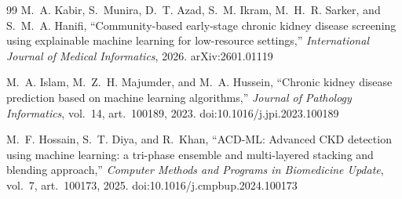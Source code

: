 \documentclass[conference]{IEEEtran}
\begin{document}
\begin{thebibliography}{99}
M.~A. Kabir, S.~Munira, D.~T. Azad, S.~M. Ikram, M.~H.~R. Sarker, and
S.~M.~A. Hanifi,
``Community-based early-stage chronic kidney disease screening using
explainable machine learning for low-resource settings,''
\emph{International Journal of Medical Informatics}, 2026.
arXiv:2601.01119

M.~A. Islam, M.~Z.~H. Majumder, and M.~A. Hussein,
``Chronic kidney disease prediction based on machine learning algorithms,''
\emph{Journal of Pathology Informatics}, vol.~14, art.~100189, 2023.
doi:10.1016/j.jpi.2023.100189

M.~F. Hossain, S.~T. Diya, and R.~Khan,
``ACD-ML: Advanced CKD detection using machine learning: a tri-phase ensemble
and multi-layered stacking and blending approach,''
\emph{Computer Methods and Programs in Biomedicine Update}, vol.~7,
art.~100173, 2025.
doi:10.1016/j.cmpbup.2024.100173

\end{thebibliography}
\end{document}
